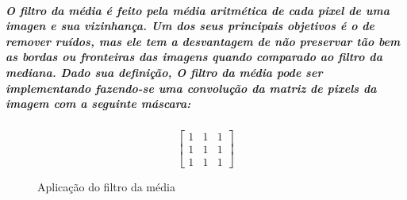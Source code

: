 \documentclass[12pt,fleqn]{article}
\begin{document}
      \subparagraph{\normalfont O filtro da média é feito pela média aritmética de cada pixel de uma imagen e sua vizinhança. Um dos seus principais objetivos é o de remover 
      ruídos, mas ele tem a desvantagem de não preservar tão bem as bordas ou fronteiras das imagens quando comparado ao filtro da mediana. Dado sua definição, O filtro da média 
      pode ser implementando fazendo-se uma convolução da matriz de pixels da imagem com a seguinte máscara:}

      \begin{equation*}
        \begin{bmatrix}
            1 & 1 & 1 \\
            1 & 1 & 1 \\
            1 & 1 & 1
        \end{bmatrix}
      \end{equation*}
     

      \newpage

      \begin{figure}[!htb]
      \centering
      \caption{Aplicação do filtro da média}
      \label{fig:Resultado 1}
      \end{figure}
\end{document}
